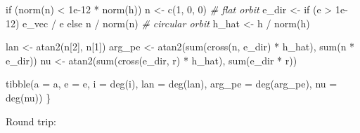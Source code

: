 \documentclass[
  10.5pt,
  letterpaper,
]{scrbook}
\newenvironment{Shaded}{\begin{snugshade}}{\end{snugshade}}
\newcommand{\AttributeTok}[1]{\textcolor[rgb]{0.00,0.00,0.00}{#1}}
\newcommand{\CommentTok}[1]{\textcolor[rgb]{0.00,0.00,0.00}{\textit{#1}}}
\newcommand{\ControlFlowTok}[1]{\textcolor[rgb]{0.00,0.00,0.00}{#1}}
\newcommand{\DecValTok}[1]{\textcolor[rgb]{0.00,0.00,0.00}{#1}}
\newcommand{\FloatTok}[1]{\textcolor[rgb]{0.00,0.00,0.00}{#1}}
\newcommand{\FunctionTok}[1]{\textcolor[rgb]{0.00,0.00,0.00}{#1}}
\newcommand{\NormalTok}[1]{\textcolor[rgb]{0.00,0.00,0.00}{#1}}
\newcommand{\OtherTok}[1]{\textcolor[rgb]{0.00,0.00,0.00}{#1}}
\newcommand{\SpecialCharTok}[1]{\textcolor[rgb]{0.00,0.00,0.00}{#1}}
\theoremstyle{definition}
\theoremstyle{plain}
\theoremstyle{remark}
\begin{document}
\begin{Shaded}
\begin{Highlighting}[]
  \ControlFlowTok{if}\NormalTok{ (}\FunctionTok{norm}\NormalTok{(n) }\SpecialCharTok{\textless{}} \FloatTok{1e{-}12} \SpecialCharTok{*} \FunctionTok{norm}\NormalTok{(h)) n }\OtherTok{\textless{}{-}} \FunctionTok{c}\NormalTok{(}\DecValTok{1}\NormalTok{, }\DecValTok{0}\NormalTok{, }\DecValTok{0}\NormalTok{)       }\CommentTok{\# flat orbit}
\NormalTok{  e\_dir }\OtherTok{\textless{}{-}} \ControlFlowTok{if}\NormalTok{ (e }\SpecialCharTok{\textgreater{}} \FloatTok{1e{-}12}\NormalTok{) e\_vec }\SpecialCharTok{/}\NormalTok{ e }\ControlFlowTok{else}\NormalTok{ n }\SpecialCharTok{/} \FunctionTok{norm}\NormalTok{(n)   }\CommentTok{\# circular orbit}
\NormalTok{  h\_hat }\OtherTok{\textless{}{-}}\NormalTok{ h }\SpecialCharTok{/} \FunctionTok{norm}\NormalTok{(h)}

\NormalTok{  lan    }\OtherTok{\textless{}{-}} \FunctionTok{atan2}\NormalTok{(n[}\DecValTok{2}\NormalTok{], n[}\DecValTok{1}\NormalTok{])}
\NormalTok{  arg\_pe }\OtherTok{\textless{}{-}} \FunctionTok{atan2}\NormalTok{(}\FunctionTok{sum}\NormalTok{(}\FunctionTok{cross}\NormalTok{(n, e\_dir) }\SpecialCharTok{*}\NormalTok{ h\_hat), }\FunctionTok{sum}\NormalTok{(n }\SpecialCharTok{*}\NormalTok{ e\_dir))}
\NormalTok{  nu     }\OtherTok{\textless{}{-}} \FunctionTok{atan2}\NormalTok{(}\FunctionTok{sum}\NormalTok{(}\FunctionTok{cross}\NormalTok{(e\_dir, r) }\SpecialCharTok{*}\NormalTok{ h\_hat), }\FunctionTok{sum}\NormalTok{(e\_dir }\SpecialCharTok{*}\NormalTok{ r))}

  \FunctionTok{tibble}\NormalTok{(}\AttributeTok{a =}\NormalTok{ a, }\AttributeTok{e =}\NormalTok{ e, }\AttributeTok{i =} \FunctionTok{deg}\NormalTok{(i), }\AttributeTok{lan =} \FunctionTok{deg}\NormalTok{(lan),}
         \AttributeTok{arg\_pe =} \FunctionTok{deg}\NormalTok{(arg\_pe), }\AttributeTok{nu =} \FunctionTok{deg}\NormalTok{(nu))}
\NormalTok{\}}
\end{Highlighting}
\end{Shaded}

Round trip:

\begin{Shaded}
\end{Shaded}
\end{document}
